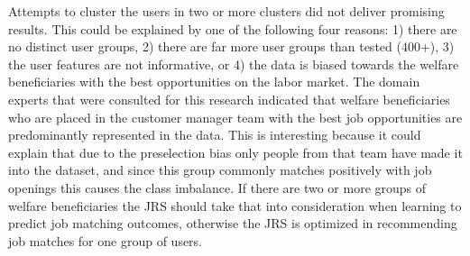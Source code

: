 Attempts to cluster the users in two or more clusters did not deliver promising results.
This could be explained by one of the following four reasons: 1) there are no distinct user groups, 2) there are far more user groups than tested (400+), 3) the user features are not informative, or 4) the data is biased towards the welfare beneficiaries with the best opportunities on the labor market.
The domain experts that were consulted for this research indicated that welfare beneficiaries who are placed in the customer manager team with the best job opportunities are predominantly represented in the data.  
This is interesting because it could explain that due to the preselection bias only people from that team have made it into the dataset, and since this group commonly matches positively with job openings this causes the class imbalance.
If there are two or more groups of welfare beneficiaries the JRS should take that into consideration when learning to predict job matching outcomes, otherwise the JRS is optimized in recommending job matches for one group of users. 

